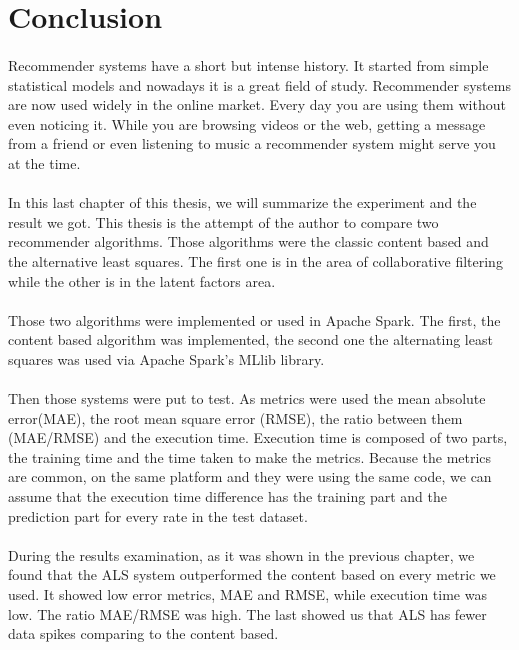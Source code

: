 \newpage
\section{Conclusion}
\paragraph{}Recommender systems have a short but intense history. It started from simple statistical models and nowadays it is a great field of study. Recommender systems are now used widely in the online market. Every day you are using them without even noticing it. While you are browsing videos or the web, getting a message from a friend or even listening to music a recommender system might serve you at the time.

\paragraph{} In this last chapter of this thesis, we will summarize the experiment and the result we got. This thesis is the attempt of the author to compare two recommender algorithms. Those algorithms were the classic content based and the alternative least squares. The first one is in the area of collaborative filtering while the other is in the latent factors area.

\paragraph{} Those two algorithms were implemented or used in Apache Spark. The first, the content based algorithm was implemented, the second one the alternating least squares was used via Apache Spark's MLlib library.

\paragraph{} Then those systems were put to test. As metrics were used the mean absolute error(MAE), the root mean square error (RMSE), the ratio between them (MAE/RMSE) and the execution time. Execution time is composed of two parts, the training time and the time taken to make the metrics. Because the metrics are common, on the same platform and they were using the same code, we can assume that the execution time difference has the training part and the prediction part for every rate in the test dataset.

\paragraph{} During the results examination, as it was shown in the previous chapter, we found that the ALS system outperformed the content based on every metric we used. It showed low error metrics, MAE and RMSE, while execution time was low. The ratio MAE/RMSE was high. The last showed us that ALS has fewer data spikes comparing to the content based.

